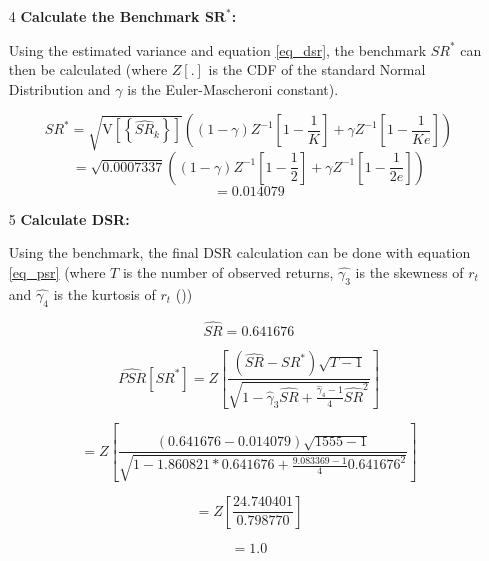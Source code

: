 \documentclass[a4paper,11pt,oneside]{article}
\theoremstyle{plain}
\theoremstyle{definition}
\begin{document}
\begin{itemize}
		\item [4] \textbf{Calculate the Benchmark $\mathbf{SR^*}$:} \newline
		
		Using the estimated variance and equation \eqref{eq_dsr}, the benchmark $SR^*$ can then be calculated (where $Z[.]$ is the CDF of the standard Normal Distribution 
		and $\gamma$ is the Euler-Mascheroni constant).
		
		\begin{equation}
		S R^{*}=\sqrt{\mathrm{V}\left[\left\{\widehat{S R}_{k}\right\}\right]}\left((1-\gamma) Z^{-1}\left[1-\frac{1}{K}\right]+\gamma Z^{-1}\left[1-\frac{1}{K e}\right]\right)
		\end{equation}
		\begin{equation}
		=\sqrt{{0.0007337}}\left((1-\gamma) Z^{-1}\left[1-\frac{1}{2}\right]+\gamma Z^{-1}\left[1-\frac{1}{2 e}\right]\right)
		\end{equation}
		\begin{equation}
		=0.014079
		\end{equation}
		
		\item [5] \textbf{Calculate DSR:} \newline
		
		Using the benchmark, the final DSR calculation can be done with equation \eqref{eq_psr} (where $T$ is the number of observed returns, $\hat{\gamma_3}$ is the skewness of $r_t$ and $\hat{\gamma_4}$ is the kurtosis of $r_t$	())
		
		\begin{equation}
		\widehat{SR}=0.641676
		\end{equation}
		
		\begin{equation}
		\widehat{P S R}\left[S R^{*}\right]=Z\left[\frac{\left(\widehat{S R}-S R^{*}\right) \sqrt{T-1}}{\sqrt{1-\hat{\gamma}_{3} \widehat{S R}+\frac{\hat{\gamma}_{4}-1}{4} \widehat{S R}^{2}}}\right]
		\end{equation}
		
		\begin{equation}
		=Z\left[\frac{\left({0.641676}-{0.014079}\right) \sqrt{1555-1}}{\sqrt{1-{1.860821}\ast{0.641676}+\frac{{9.083369}-1}{4}{0.641676}^{2}}}\right]
		\end{equation}
		
		\begin{equation}
		=Z\left[\frac{24.740401}{0.798770}\right]
		\end{equation}
		
		\begin{equation}
		= {1.0}
		\end{equation}
		
		
	\end{itemize}
	
\end{document}
